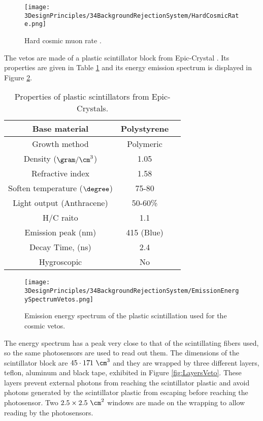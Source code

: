 \begin{figure}[h]
\centering
\texttt{[image: 3DesignPrinciples/34BackgroundRejectionSystem/HardCosmicRate.png]}
\caption{Hard cosmic muon rate \cite{HardCosmicMuonRatePlot}.\label{fig:HardCoscmicRate}}
\end{figure}

The vetos are made of a plastic scintillator block from Epic-Crystal \cite{ScintillatorVeto}. Its properties are given in Table \ref{tab:ParametersScintillatorVeto} and its energy emission spectrum is displayed in Figure \ref{fig:EmissionEnergySpectrumVeto}.

\begin{table}[]
\begin{center}
\begin{tabular}{|c|c|c|}
\hline \hline 
Base material & Polystyrene \\ \hline
Growth method & Polymeric \\ \hline
Density ($\gram/\cm^3$)& 1.05 \\ \hline
Refractive index & 1.58 \\ \hline
Soften temperature ($\degree$) & 75-80 \\ \hline
Light output (Anthracene) & 50-60\% \\ \hline
H/C raito & 1.1 \\ \hline
Emission peak (nm) & 415 (Blue) \\ \hline
Decay Time, (ns) & 2.4 \\ \hline
Hygroscopic & No \\ \hline
\end{tabular}
\caption{Properties of plastic scintillators from Epic-Crystals. \cite{ScintillatorVeto}}
\label{tab:ParametersScintillatorVeto}
\end{center}
\end{table}

\begin{figure}[]
\centering
\texttt{[image: 3DesignPrinciples/34BackgroundRejectionSystem/EmissionEnergySpectrumVetos.png]}
\caption{Emission energy spectrum of the plastic scintillation used for the cosmic vetos.\label{fig:EmissionEnergySpectrumVeto}~\cite{ScintillatorVeto}}
\end{figure}

The energy spectrum has a peak very close to that of the scintillating fibers used, so the same photosensors are used to read out them. The dimensions of the scintillator block are $45 \cdot{} 17 \dot{} 1~\cm^3$ and they are wrapped by three different layers, teflon, aluminum and black tape, exhibited in Figure \ref{fig:LayersVeto}. These layers prevent external photons from reaching the scintillator plastic and avoid photons generated by the scintillator plastic from escaping before reaching the photosensor. Two $2.5\times 2.5 ~\cm^2$ windows are made on the wrapping to allow reading by the photosensors.


